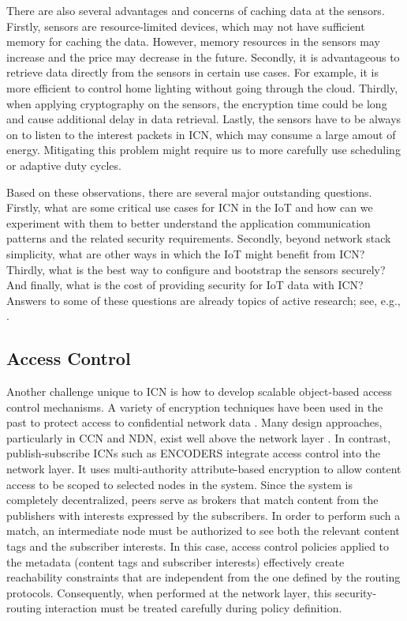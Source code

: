 There are also several advantages and concerns of caching data at the sensors. Firstly,
sensors are resource-limited devices, which may not have sufficient memory for caching the data.
However, memory resources in the sensors may increase and the
price may decrease in the future. Secondly, it is advantageous to retrieve data directly from the
sensors in certain use cases. For example, it is more efficient to control home lighting without
going through the cloud. Thirdly, when applying cryptography on  the sensors, the encryption time
could be long and cause additional delay in data retrieval. Lastly, the sensors have to be always
on to listen to the interest packets in ICN, which may consume a large amout of energy.
Mitigating this problem might require us to more carefully use scheduling or adaptive duty cycles.

Based on these observations, there are several major outstanding questions. Firstly, what are
some critical use cases for ICN in the IoT and how can we experiment with them to
better understand the application communication patterns and the related security requirements.
Secondly, beyond network stack simplicity, what are other ways in which the IoT might
benefit from ICN? Thirdly, what is the best way to configure and bootstrap the sensors securely?
And finally, what is the cost of providing security for IoT data with ICN? Answers to
some of these questions are already topics of active research; see, e.g., \cite{shang2016named}.

\subsection{Access Control}
Another challenge unique to ICN is how to develop scalable object-based
access control mechanisms. A variety of encryption techniques have been used
in the past to protect access to confidential network data \cite{tourani2016security}.
Many design approaches, particularly in CCN and NDN, exist well above the network
layer \cite{Smetters2010,Misra2013,Ion2013,Wood2014,ifip15,yu2015name,ghali2015interest}.
In contrast, publish-subscribe ICNs such as ENCODERS \cite{raykova2015decentralized} integrate
access control into the network layer. It uses multi-authority attribute-based encryption \cite{chase2007multi}
to allow content access to be scoped to selected nodes in the system. Since the
system is completely decentralized, peers serve as brokers that match content from
the publishers with interests expressed by the subscribers. In order to perform such a match,
an intermediate node must be authorized to see both the relevant content tags and
the subscriber interests. In this case,
access control policies applied to the metadata (content tags and subscriber interests)
effectively create reachability constraints that are independent from the one defined by
the routing protocols. Consequently, when performed at the network layer,
this security-routing interaction must be treated carefully during policy definition.

